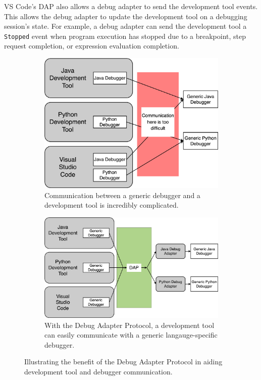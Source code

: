 \documentclass{article}
\begin{document}
VS Code's DAP also allows a debug adapter to send the development tool events. This allows the debug adapter to update the development tool on a debugging session's state. For example, a debug adapter can send the development tool a \lstinline{Stopped} event when program execution has stopped due to a breakpoint, step request completion, or expression evaluation completion. 
    
\begin{figure}[b]
    \begin{subfigure}[c][][c]{0.45\textwidth}
        \includegraphics[width=\textwidth]{no-dap-theory.png}
        \caption{Communication between a generic debugger and a development tool is incredibly complicated.}
        \label{fig:no-dap-theory}
    \end{subfigure}
    \hspace{0.05\textwidth}
    \begin{subfigure}[c][][c]{0.45\textwidth}
        \includegraphics[width=\textwidth]{dap-theory.png}
        \caption{With the Debug Adapter Protocol, a development tool can easily communicate with a generic langauge-specific debugger.}
        \label{fig:dap-theory}
    \end{subfigure}
    \caption{Illustrating the benefit of the Debug Adapter Protocol in aiding development tool and debugger communication.}
    \label{fig:dap}
\end{figure}
\end{document}
